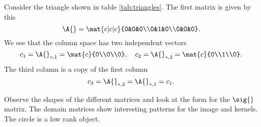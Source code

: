 Consider the triangle shown in table \eqref{tab:triangles}. The first matrix is given by this
\begin{equation}
  \A{} = \mat{c|c|c}{0&0&0\\0&1&0\\0&0&0}.
\end{equation}
We see that the column space has two independent vectors
\begin{equation}
  c_{1} = \A{}_{*,1} = \mat{c}{0\\0\\0}, \quad c_{2} = \A{}_{*,2} = \mat{c}{0\\1\\0}.
\end{equation}
The third column is a copy of the first column
\begin{equation}
  c_{3} = \A{}_{*,2} = \A{}_{*,1} = c_{1}.
\end{equation}

Observe the shapes of the different matrices and look at the form for the $\sig{}$ matrix. The domain matrices show interesting patterns for the image and kernels. The circle is a low rank object. 

\break
\clearpage

